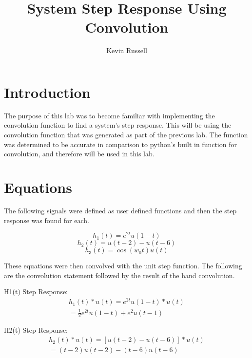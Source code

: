 \documentclass[12pt, titlepage]{article}
\author{Kevin Russell}
\title{System Step Response Using Convolution}
\date{\parbox{\linewidth}{\centering%
  \experimentDate
  \endgraf\bigskip
  \className\ -- Section \sectionNumber\
}}
\begin{document}
 \newpage
	    \maketitle
    
    \newpage
        \tableofcontents
    
    \newpage
        \section{Introduction}
        The purpose of this lab was to become familiar with implementing the convolution function to find a system's step response.  This will be using the convolution function that was generated as part of the previous lab.  The function was determined to be accurate in comparison to python's built in function for convolution, and therefore will be used in this lab.
        
        \section{Equations}
        The following signals were defined as user defined functions and then the step response was found for each.
        
        \begin{equation}
            h_{1}(t) = e^{2t}u(1-t)
        \end{equation}
        \begin{equation}
             h_{2}(t)=u(t-2)-u(t-6)
        \end{equation}
        \begin{equation}
            h_{3}(t)=\cos{(w_0t)}u(t)
        \end{equation}
        
        These equations were then convolved with the unit step function.  The following are the convolution statement followed by the result of the hand convolution.
        
        
        H1(t) Step Response:
        \begin{equation}
            \begin{split}
                h_{1}(t) * u(t) = e^{2t}u(1-t) * u(t)\\
                = \frac{1}{2}e^{2t}u(1-t) + e^2u(t-1)
            \end{split}
            \nonumber
        \end{equation}
        
        H2(t) Step Response:
        \begin{equation}
            \begin{split}
                h_2(t)*u(t) = [u(t-2) - u(t-6)] * u(t)\\
                =(t-2)u(t-2) - (t-6)u(t-6)
            \end{split}
            \nonumber
        \end{equation}
        
\end{document}
